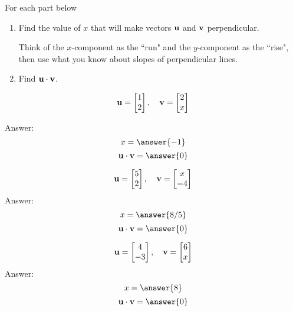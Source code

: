 \documentclass{ximera}
\renewcommand{\vec}[1]{{\bf #1}}
\newcommand{\dotp}{\cdot}
\begin{document}
\begin{problem}
 For each part below
 \begin{enumerate}
 \item 
 Find the value of $x$ that will make vectors $\vec{u}$ and $\vec{v}$ perpendicular. 
  \begin{hint} Think of the $x$-component as the ``run" and the $y$-component as the ``rise", then use what you know about slopes of perpendicular lines.
  \end{hint}
  \item Find $\vec{u}\dotp\vec{v}$.
  \end{enumerate}
  
 
  \begin{problem}
    $$\vec{u} = \begin{bmatrix}1\\2\end{bmatrix},\quad \vec{v}=\begin{bmatrix}2\\x\end{bmatrix}$$
    
    Answer:  
    $$x = \answer{-1}$$
    $$\vec{u}\dotp\vec{v}=\answer{0}$$
  \end{problem}

  \begin{problem}
    $$\vec{u} = \begin{bmatrix}5\\2\end{bmatrix},\quad \vec{v}=\begin{bmatrix}x\\-4\end{bmatrix}$$
    Answer:
    $$x = \answer{8/5}$$
    $$\vec{u}\dotp\vec{v}=\answer{0}$$
  \end{problem}

  \begin{problem}
    $$\vec{u} = \begin{bmatrix} 4\\-3\end{bmatrix},\quad \vec{v} =\begin{bmatrix}6\\x\end{bmatrix}$$ 
    Answer:
    $$x = \answer{8}$$
    $$\vec{u}\dotp\vec{v}=\answer{0}$$
  \end{problem}
\end{problem}
\end{document}
